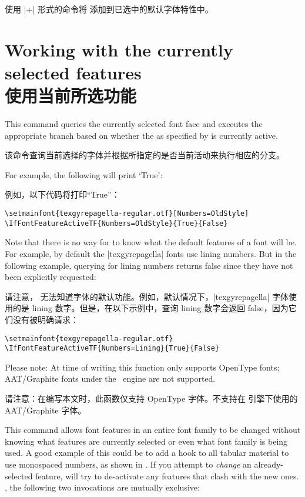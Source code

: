 \documentclass[a4paper]{l3doc}
\begin{document}
使用 |+| 形式的命令将  添加到已选中的默认字体特性中。

\section{Working with the currently selected features\\使用当前所选功能}
\label{sec:addfontfeatures}



This command queries the currently selected font face and executes the appropriate branch based on whether the  as specified by  is currently active.

该命令查询当前选择的字体并根据所指定的是否当前活动来执行相应的分支。

For example, the following will print `True':

例如，以下代码将打印“True”：

\begin{Verbatim}
\setmainfont{texgyrepagella-regular.otf}[Numbers=OldStyle]
\IfFontFeatureActiveTF{Numbers=OldStyle}{True}{False}
\end{Verbatim}

Note that there is no way for  to know what the default features of a font will be. For example, by default the |texgyrepagella| fonts use lining numbers. But in the following example, querying for lining numbers returns false since they have not been explicitly requested:

请注意， 无法知道字体的默认功能。例如，默认情况下，|texgyrepagella| 字体使用的是 lining 数字。但是，在以下示例中，查询 lining 数字会返回 false，因为它们没有被明确请求：

\begin{Verbatim}
\setmainfont{texgyrepagella-regular.otf}
\IfFontFeatureActiveTF{Numbers=Lining}{True}{False}
\end{Verbatim}

Please note: At time of writing this function only supports OpenType fonts; AAT/Graphite fonts under the \XeTeX\ engine are not supported.

请注意：在编写本文时，此函数仅支持 OpenType 字体。不支持在 \XeTeX 引擎下使用的 AAT/Graphite 字体。


This command allows font features in an entire font family to
be changed without knowing what features are currently selected or even what
font family is being used. A good example of this could be to add a hook to all
tabular material to use monospaced numbers, as shown in .
If you attempt to \emph{change} an already-selected feature,  will try to de-activate any features that clash with the new ones.
\Eg, the following two invocations are mutually exclusive:
\end{document}
